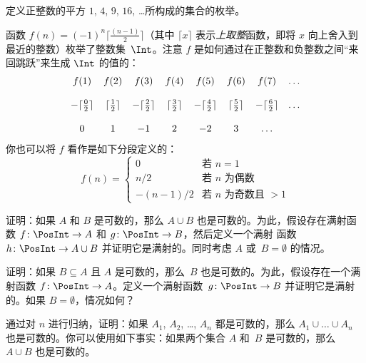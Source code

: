 \documentclass[../../../include/open-logic-section]{subfiles}
\begin{document}
\begin{prob}
定义正整数的平方 $1$, $4$, $9$, $16$, \dots 所构成的集合的枚举。
\end{prob}

\begin{ex}
函数 $f(n) = (-1)^{n} \lceil \frac{(n-1)}{2}\rceil$（其中
$\lceil x \rceil$ 表示\emph{上取整}函数，即将
$x$ 向上舍入到最近的整数）枚举了整数集~$\Int$。注意 $f$ 是如何通过在正整数和负整数之间“来回跳跃”来生成 $\Int$ 的值的：
\[
\begin{array}{c c c c c c c c}
f(1) & f(2) & f(3) & f(4) & f(5) & f(6) & f(7) & \dots \\ \\
- \lceil \tfrac{0}{2} \rceil & \lceil \tfrac{1}{2}\rceil & - \lceil \tfrac{2}{2} \rceil & \lceil \tfrac{3}{2} \rceil & - \lceil \tfrac{4}{2} \rceil  & \lceil \tfrac{5}{2}
\rceil & - \lceil \tfrac{6}{2} \rceil & \dots \\ \\
0 & 1 & -1 & 2 & -2 & 3 & \dots
\end{array}
\]
你也可以将 $f$ 看作是如下分段定义的：
\[
f(n) = \begin{cases}
  0 & \text{若 $n = 1$}\\
  n/2 & \text{若 $n$ 为偶数}\\
  -(n-1)/2 & \text{若 $n$ 为奇数且 $>1$}
  \end{cases}
\]
\end{ex}

\begin{prob}
  证明：如果 $A$ 和 $B$ 是可数的，那么 $A \cup B$ 也是可数的。为此，假设存在满射函数 $f\colon \PosInt \to
  A$ 和 $g\colon \PosInt \to B$，然后定义一个满射
  函数~$h\colon \PosInt \to A \cup B$ 并证明它是满射的。同时考虑 $A$ 或~$B = \emptyset$ 的情况。
\end{prob}

\begin{prob}
  证明：如果 $B \subseteq A$ 且 $A$ 是可数的，那么~$B$ 也是可数的。为此，假设存在一个满射函数 $f\colon \PosInt \to
  A$。定义一个满射函数~$g\colon \PosInt \to B$ 并证明它是满射的。如果 $B = \emptyset$，情况如何？
\end{prob}

\begin{prob}
  通过对 $n$ 进行归纳，证明：如果 $A_1$, $A_2$, \dots, $A_n$ 都是可数的，那么 $A_1 \cup \dots \cup A_n$ 也是可数的。你可以使用如下事实：如果两个集合 $A$ 和~$B$ 是可数的，那么~$A \cup
  B$ 也是可数的。
\end{prob}
\end{document}
